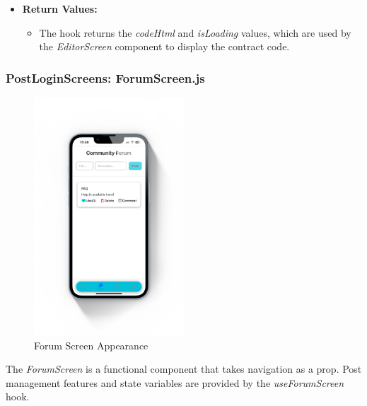 \begin{itemize}
    \item \textbf{Return Values:}
    \begin{itemize}
        \item The hook returns the \textit{codeHtml} and \textit{isLoading} values, which are used by the \textit{EditorScreen} component to display the contract code.
    \end{itemize}
\end{itemize}

\subsubsection{PostLoginScreens: ForumScreen.js}

\begin{figure}[!ht]
    \centering
    \includegraphics[width=0.5\textwidth]
    {LATEX/Appendices/Images/Software/Frontend/forum_screen.png}
    \caption{Forum Screen Appearance}
    \label{fig:forum screen}
\end{figure} 

The \textit{ForumScreen} is a functional component that takes navigation as a prop. Post management features and state variables are provided by the \textit{useForumScreen} hook.

